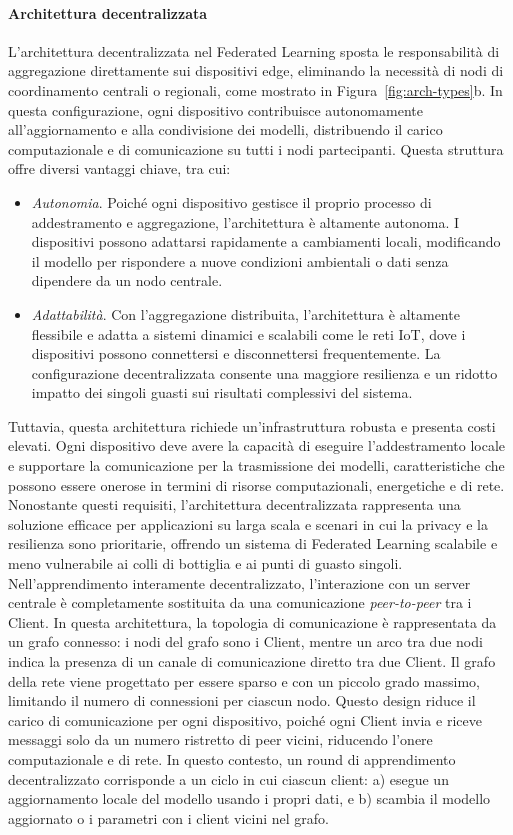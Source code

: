 \documentclass[a4paper, oneside, openright]{report}
\begin{document}
\paragraph{Architettura decentralizzata}
L'architettura decentralizzata nel Federated Learning sposta le responsabilità di aggregazione direttamente sui dispositivi edge, eliminando la necessità di nodi di coordinamento centrali o regionali, come mostrato in Figura~\ref{fig:arch-types}b. In questa configurazione, ogni dispositivo contribuisce autonomamente all'aggiornamento e alla condivisione dei modelli, distribuendo il carico computazionale e di comunicazione su tutti i nodi partecipanti. Questa struttura offre diversi vantaggi chiave, tra cui:
\begin{itemize}
\item \textit{Autonomia}. Poiché ogni dispositivo gestisce il proprio processo di addestramento e aggregazione, l'architettura è altamente autonoma. I dispositivi possono adattarsi rapidamente a cambiamenti locali, modificando il modello per rispondere a nuove condizioni ambientali o dati senza dipendere da un nodo centrale.
\item \textit{Adattabilità}. Con l’aggregazione distribuita, l'architettura è altamente flessibile e adatta a sistemi dinamici e scalabili come le reti IoT, dove i dispositivi possono connettersi e disconnettersi frequentemente. La configurazione decentralizzata consente una maggiore resilienza e un ridotto impatto dei singoli guasti sui risultati complessivi del sistema.
\end{itemize}

Tuttavia, questa architettura richiede un'infrastruttura robusta e presenta costi elevati. Ogni dispositivo deve avere la capacità di eseguire l'addestramento locale e supportare la comunicazione per la trasmissione dei modelli, caratteristiche che possono essere onerose in termini di risorse computazionali, energetiche e di rete. Nonostante questi requisiti, l'architettura decentralizzata rappresenta una soluzione efficace per applicazioni su larga scala e scenari in cui la privacy e la resilienza sono prioritarie, offrendo un sistema di Federated Learning scalabile e meno vulnerabile ai colli di bottiglia e ai punti di guasto singoli.
Nell'apprendimento interamente decentralizzato, l'interazione con un server centrale è completamente sostituita da una comunicazione \textit{peer-to-peer} tra i Client. In questa architettura, la topologia di comunicazione è rappresentata da un grafo connesso: i nodi del grafo sono i Client, mentre un arco tra due nodi indica la presenza di un canale di comunicazione diretto tra due Client. Il grafo della rete viene progettato per essere sparso e con un piccolo grado massimo, limitando il numero di connessioni per ciascun nodo. Questo design riduce il carico di comunicazione per ogni dispositivo, poiché ogni Client invia e riceve messaggi solo da un numero ristretto di peer vicini, riducendo l'onere computazionale e di rete.
In questo contesto, un round di apprendimento decentralizzato corrisponde a un ciclo in cui ciascun client: a) esegue un aggiornamento locale del modello usando i propri dati, e b) scambia il modello aggiornato o i parametri con i client vicini nel grafo.
\end{document}
